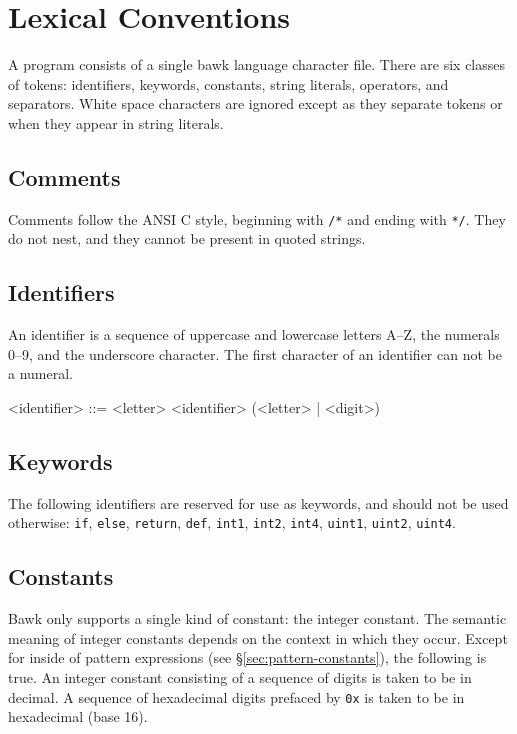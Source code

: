 \section{Lexical Conventions}
A program consists of a single bawk language character file.  There are six classes of tokens: identifiers, keywords, constants, string literals, operators, and separators.  White space characters are ignored except as they separate tokens or when they appear in string literals.

\subsection{Comments}
Comments follow the ANSI C style, beginning with \texttt{/*} and ending with \texttt{*/}.  They do not nest, and they cannot be present in quoted strings.

\subsection{Identifiers}
\label{sec:identifiers}
An identifier is a sequence of uppercase and lowercase letters A--Z, the numerals 0--9, and the underscore character.  The first character of an identifier can not be a numeral.

\begin{grammar}
<identifier> ::= <letter>
\alt <identifier> (<letter> | <digit>)
\end{grammar}

\subsection{Keywords}
The following identifiers are reserved for use as keywords, and should not be used otherwise: \texttt{if}, \texttt{else}, \texttt{return}, \texttt{def}, \texttt{int1}, \texttt{int2}, \texttt{int4}, \texttt{uint1}, \texttt{uint2}, \texttt{uint4}.

\subsection{Constants}
\label{sec:constants}
Bawk only supports a single kind of constant: the integer constant.  The semantic meaning of integer constants depends on the context in which they occur.  Except for inside of pattern expressions (see \S\ref{sec:pattern-constants}), the following is true.  An integer constant consisting of a sequence of digits is taken to be in decimal.  A sequence of hexadecimal digits prefaced by \texttt{0x} is taken to be in hexadecimal (base 16).

